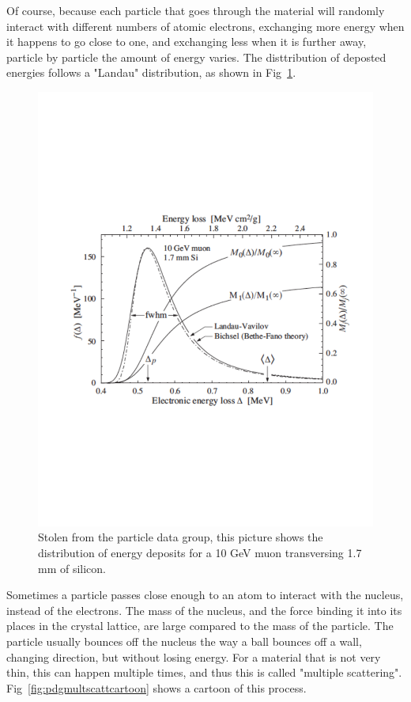 Of course, because each particle that goes through the material will randomly interact with different numbers of atomic electrons, exchanging more energy when it happens to go close to one, and exchanging less when it is further away, particle by particle the amount of energy varies.  The disttribution of deposted energies follows a "Landau" distribution, as shown in Fig~\ref{fig:landau}.


\begin{figure}[h]
\centering\includegraphics[scale=0.5]{./particleinteractions/Pictures/landau.pdf}
\caption{Stolen from the particle data group, this picture shows the distribution of energy deposits for a 10 GeV muon transversing 1.7 mm of silicon. }
\label{fig:landau}
\end{figure}

Sometimes a particle passes close enough to an atom to interact with the nucleus, instead of the electrons.  The mass of the nucleus, and the force binding it into its places in the crystal lattice, are large compared to the mass of the particle.  The particle usually bounces off the nucleus the way a ball bounces off a wall, changing direction, but without losing energy.  For a material that is not very thin, this can happen multiple times, and thus this is called "multiple scattering".  Fig~\ref{fig:pdgmultscattcartoon} shows a cartoon of this process.


